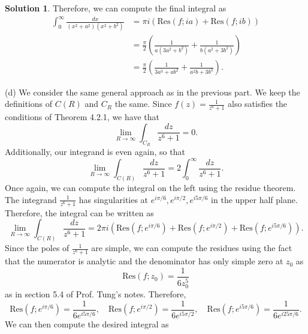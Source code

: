 \documentclass[12pt]{article}
\newcommand{\Res}{\text{Res}}
\theoremstyle{definition}
\newtheorem{sol}{Solution}
\theoremstyle{remark}
\begin{document}
\begin{sol}
Therefore, we can compute the final integral as
\begin{align}
    \int_{0}^\infty \frac{dx}{(x^2+a^2)(x^2+b^2)} &= \pi i ( \Res(f; ia) +  \Res(f; ib)   )\\
                                                  &= \frac{\pi}{2} \left( \frac{1}{a(3a^2 + b^2)} + \frac{1}{b(a^2 +3b^2)}\right)\\
                                                  &= \frac{\pi}{2} \left( \frac{1}{3a^3 + ab^2} + \frac{1}{a^2b +3b^3} \right).
\end{align}

\newpage

    (d) We consider the same general approach as in the previous part. We keep the definitions of $C(R)$ and $C_R$ the same. Since $f(z) = \frac{1}{z^6+1}$ also satisfies the conditions of Theorem 4.2.1, we have that 
    \begin{equation*}
        \lim\limits_{R\to\infty}  \int_{C_R}  \frac{dz}{z^6+1} = 0.
    \end{equation*}
    Additionally, our integrand is even again, so that 
    \begin{equation}
            \lim\limits_{R\to\infty}  \int_{C(R)} \frac{dz}{z^6+1}   = 2 \int_{0}^\infty \frac{dz}{z^6+1}. 
    \end{equation}
    Once again, we can compute the integral on the left using the residue theorem. The integrand $ \frac{1}{z^6+1}$ has singularities at $e^{i\pi/6}, e^{i\pi/2}, e^{i5\pi/6}$ in the upper half plane. Therefore, the integral can be written as
\begin{equation}
    \lim\limits_{R\to\infty}  \int_{C(R)} \frac{dz}{z^6+1} = 2\pi i( \Res(f;e^{i\pi/6}) + \Res(f; e^{i\pi/2}) + \Res(f;  e^{i5\pi/6}) ). 
\end{equation}
Since the poles of $ \frac{1}{z^6+1}$ are simple, we can compute the residues using the fact that the numerator is analytic and the denominator has only simple zero at $z_0$ as
\begin{equation}
    \Res(f; z_0) = \frac{1}{6z_0^5} 
\end{equation}
as in section 5.4 of Prof. Tung's notes. Therefore, 
\begin{equation}
    \Res(f;e^{i\pi/6}) = \frac{1}{6e^{i5\pi/6}},\quad \Res(f; e^{i\pi/2}) = \frac{1}{6e^{i5\pi/2}},\quad \Res(f; e^{i 5\pi/6}) = \frac{1}{6 e^{i25\pi/6}}. 
\end{equation}
We can then compute the desired integral as

\end{sol}
\end{document}
